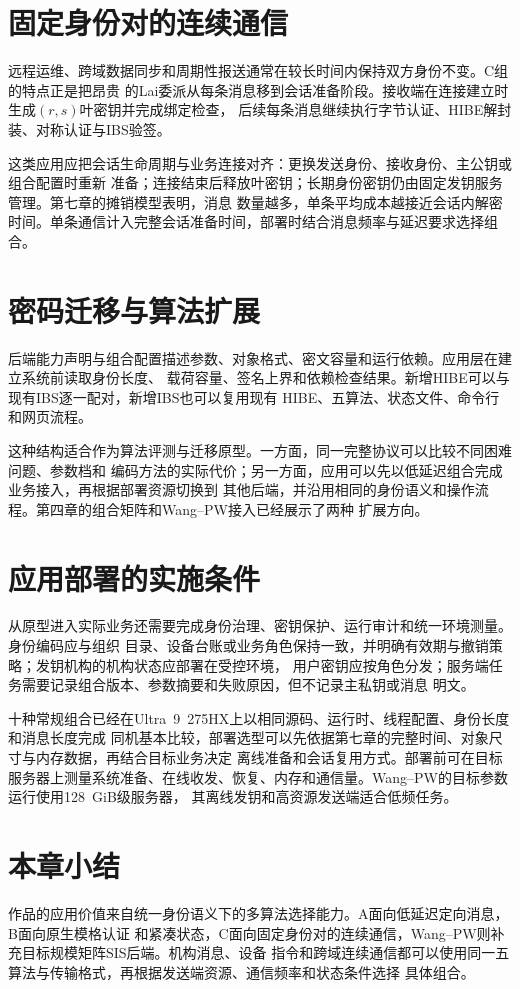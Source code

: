 \section{固定身份对的连续通信}

远程运维、跨域数据同步和周期性报送通常在较长时间内保持双方身份不变。C组的特点正是把昂贵
的Lai委派从每条消息移到会话准备阶段。接收端在连接建立时生成$(r,s)$叶密钥并完成绑定检查，
后续每条消息继续执行字节认证、HIBE解封装、对称认证与IBS验签。

这类应用应把会话生命周期与业务连接对齐：更换发送身份、接收身份、主公钥或组合配置时重新
准备；连接结束后释放叶密钥；长期身份密钥仍由固定发钥服务管理。第七章的摊销模型表明，消息
数量越多，单条平均成本越接近会话内解密时间。单条通信计入完整会话准备时间，部署时结合消息频率与延迟要求选择组合。

\section{密码迁移与算法扩展}

后端能力声明与组合配置描述参数、对象格式、密文容量和运行依赖。应用层在建立系统前读取身份长度、
载荷容量、签名上界和依赖检查结果。新增HIBE可以与现有IBS逐一配对，新增IBS也可以复用现有
HIBE、五算法、状态文件、命令行和网页流程。

这种结构适合作为算法评测与迁移原型。一方面，同一完整协议可以比较不同困难问题、参数档和
编码方法的实际代价；另一方面，应用可以先以低延迟组合完成业务接入，再根据部署资源切换到
其他后端，并沿用相同的身份语义和操作流程。第四章的组合矩阵和Wang--PW接入已经展示了两种
扩展方向。

\section{应用部署的实施条件}

从原型进入实际业务还需要完成身份治理、密钥保护、运行审计和统一环境测量。身份编码应与组织
目录、设备台账或业务角色保持一致，并明确有效期与撤销策略；发钥机构的机构状态应部署在受控环境，
用户密钥应按角色分发；服务端任务需要记录组合版本、参数摘要和失败原因，但不记录主私钥或消息
明文。

十种常规组合已经在Ultra~9~275HX上以相同源码、运行时、线程配置、身份长度和消息长度完成
同机基本比较，部署选型可以先依据第七章的完整时间、对象尺寸与内存数据，再结合目标业务决定
离线准备和会话复用方式。部署前可在目标服务器上测量系统准备、在线收发、恢复、内存和通信量。Wang--PW的目标参数运行使用128~GiB级服务器，
其离线发钥和高资源发送端适合低频任务。

\section{本章小结}

作品的应用价值来自统一身份语义下的多算法选择能力。A面向低延迟定向消息，B面向原生模格认证
和紧凑状态，C面向固定身份对的连续通信，Wang--PW则补充目标规模矩阵SIS后端。机构消息、设备
指令和跨域连续通信都可以使用同一五算法与传输格式，再根据发送端资源、通信频率和状态条件选择
具体组合。
